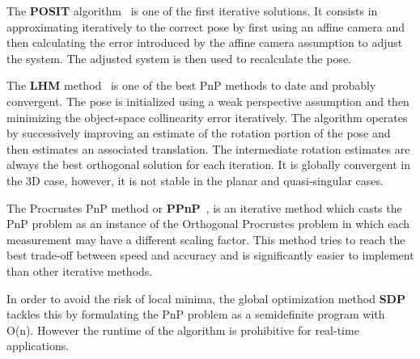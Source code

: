 \documentclass[letterpaper, 10 pt, conference]{ieeeconf}  %
\begin{document}
The \textbf{POSIT} algorithm~\cite{Oberkampf1996} is one of the first iterative solutions. It consists in approximating iteratively to the correct pose by first using an affine camera and then calculating the error introduced by the affine camera assumption to adjust the system. The adjusted system is then used to recalculate the pose. %

The \textbf{LHM} method~\cite{Lu2000} is one of the best PnP methods to date and probably convergent. The pose is initialized using a weak perspective assumption and then minimizing the object-space collinearity error iteratively. The algorithm operates by successively improving an estimate of the rotation portion of the pose and then estimates an associated translation. The intermediate rotation estimates are always the best orthogonal solution for each iteration. It is globally convergent in the 3D case, however, it is not stable in the planar and quasi-singular cases. %


The Procrustes PnP method or \textbf{PPnP}~\cite{Garro2012}, is an iterative method which casts the PnP problem as an instance of the Orthogonal Procrustes problem in which each measurement may have a different scaling factor. This method tries to reach the best trade-off between speed and accuracy and is significantly easier to implement than other iterative methods.   %


In order to avoid the risk of local minima, the global optimization method \textbf{SDP}~\cite{Schweighofer2008} tackles this by formulating the PnP problem as a semidefinite program with O(n). However the runtime of the algorithm is prohibitive for real-time applications. %
\end{document}
